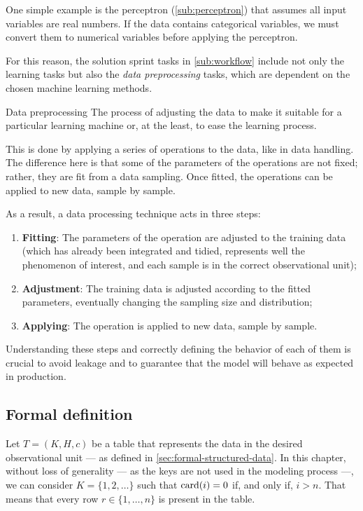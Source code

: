 One simple example is the perceptron (\cref{sub:perceptron}) that assumes all
input variables are real numbers.  If the data contains categorical variables, we must
convert them to numerical variables before applying the perceptron.

For this reason, the solution sprint tasks in \cref{sub:workflow} include not only the
learning tasks but also the \emph{data preprocessing} tasks, which are dependent on the
chosen machine learning methods.

\begin{definition}{Data preprocessing}\label{def:preprocessing}
  The process of adjusting the data to make it suitable for a particular learning machine
  or, at the least, to ease the learning process.
\end{definition}

This is done by applying a series of operations to the data, like in data handling.  The
difference here is that some of the parameters of the operations are not fixed; rather, they
are fit from a data sampling.  Once fitted, the operations can be applied to
new data, sample by sample.

As a result, a data processing technique acts in three steps:
\begin{enumerate}
  \itemsep0em
  \item \textbf{Fitting}: The parameters of the operation are adjusted to the training
    data (which has already been integrated and tidied, represents well the phenomenon of
    interest, and each sample is in the correct observational unit);
  \item \textbf{Adjustment}: The training data is adjusted according to the fitted
    parameters, eventually changing the sampling size and distribution;
  \item \textbf{Applying}: The operation is applied to new data, sample by sample.
\end{enumerate}

Understanding these steps and correctly defining the behavior of each of them is crucial
to avoid \gls{leakage} and to guarantee that the model will behave as expected in
production.

\subsection{Formal definition}
\label{sub:formal-preprocessing}

Let $T = (K, H, c)$ be a table that represents the data in the desired observational unit
--- as defined in \cref{sec:formal-structured-data}.  In this chapter, without loss of
generality --- as the keys are not used in the modeling process ---, we can consider $K =
\{1, 2, \dots\}$ such that $\rowcard[i] = 0$ if, and only if, $i > n$.  That means that
every row $r \in \{1, \dots, n\}$ is present in the table.


